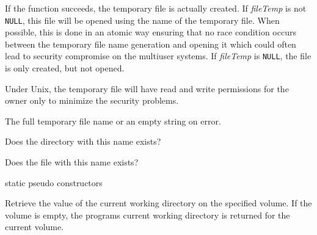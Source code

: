 If the function succeeds, the temporary file is actually created. If\rtfsp
{\it fileTemp} is not {\tt NULL}, this file will be opened using the name of
the temporary file. When possible, this is done in an atomic way ensuring that
no race condition occurs between the temporary file name generation and opening
it which could often lead to security compromise on the multiuser systems.
If {\it fileTemp} is {\tt NULL}, the file is only created, but not opened.

Under Unix, the temporary file will have read and write permissions for the
owner only to minimize the security problems.





The full temporary file name or an empty string on error.

\label{wxfilenamedirexists}



Does the directory with this name exists?

\label{wxfilenamedirname}


\label{wxfilenamefileexists}



Does the file with this name exists?

\label{wxfilenamefilename}


static pseudo constructors

\label{wxfilenamegetcwd}


Retrieve the value of the current working directory on the specified volume. If
the volume is empty, the programs current working directory is returned for the
current volume.

